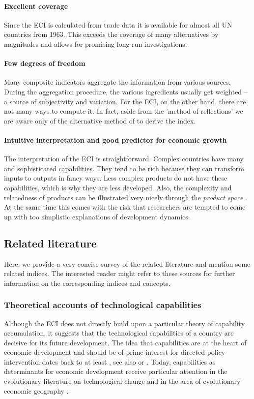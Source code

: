 \documentclass[11pt,a4paper]{article}
\begin{document}
\paragraph{Excellent coverage}
Since the ECI is calculated from trade data it is available for almost all UN countries from 1963. 
This exceeds the coverage of many alternatives by magnitudes and allows for promising long-run investigations.

\paragraph{Few degrees of freedom} 
Many composite indicators aggregate the information from various sources.
During the aggregation procedure, the various ingredients usually get weighted -- a source of subjectivity and variation.
For the ECI, on the other hand, there are not many ways to compute it.
In fact, aside from the 'method of reflections' we are aware only of the alternative method of \citet{Tacchella:2013ko} to derive the index.

\paragraph{Intuitive interpretation and good predictor for economic growth}
The interpretation of the ECI is straightforward.
Complex countries have many and sophisticated capabilities.
They tend to be rich because they can transform inputs to outputs in fancy ways.
Less complex products do not have these capabilities, which is why they are less developed.
Also, the complexity and relatedness of products can be illustrated very nicely through the \textit{product space} \citep{Hidalgo:2007cp}. 
At the same time this comes with the risk that researchers are tempted to come up with too simplistic explanations of development dynamics.


\subsection{Related literature}
Here, we provide a very concise survey of the related literature and mention some related indices.
The interested reader might refer to these sources for further information on the corresponding indices and concepts.

\subsubsection{Theoretical accounts of technological capabilities}
Although the ECI does not directly build upon a particular theory of capability accumulation, it suggests that the technological capabilities of a country are decisive for its future development.
The idea that capabilities are at the heart of economic development and should be of prime interest for directed policy intervention dates back to at least \citet{Hirschman:1958wr}, see also \citet{Lall:1992eq} or \citet{Bell:1995wj}.
Today, capabilities as determinants for economic development receive particular attention in the evolutionary literature on technological change \citep[see e.g.][]{Dosi:2015ug} and in the area of evolutionary economic geography \citep[e.g.][]{Boschma:2016kg}.
\end{document}

